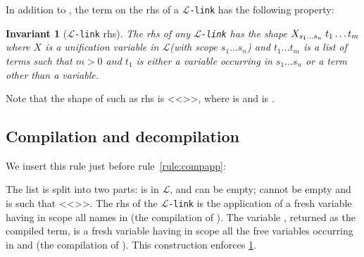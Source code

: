 \documentclass[sigconf,natbib=false,review]{acmart}
\newtheorem{invariant}{Invariant}
\newcommand{\appsep}{\ensuremath{\textcolor{lightgray}{\cdot}}}
\newcommand{\llambda}{\ensuremath{\mathcal{L}}\xspace}
\newcommand{\linkMacro}[1]{\ensuremath{#1}\texttt{-link}\xspace}
\newcommand{\linkbeta}{\linkMacro{\llambda}}
\newcommand{\linkbetaM}[3]{\ensuremath{#1 \vdash #2 =_{\llambda} #3}}
\newcommand{\rhs}{rhs\xspace}
\newcommand{\linkStore}{\texorpdfstring{\ensuremath{\mathbb{L}}\xspace}{L}}
\begin{document}
In addition to , the term on the \rhs of a \linkbeta
has the following property:

\newcommand{\rhsBetaHead}{\ensuremath{X_{s_1\dots s_n}}}
\newcommand{\rhsBeta}{\ensuremath{\rhsBetaHead\appsep t_1\dots t_m}\xspace}

\begin{invariant}[\linkbeta \rhs]
  The \rhs of any \linkbeta has the shape $X_{s_1\ldots s_n}\appsep t_1\dots t_m$
  where $X$ is a unification variable in \llambda (with scope $s_1\dots s_n$)
  and $t_1\dots t_m$ is a list of terms such that $m>0$ and
  $t_1$ is either a variable occurring in $s_1\dots s_n$ or
  a term other than a variable.
  \label{inv:beta-rhs}
\end{invariant}

\noindent Note that the shape of such as \rhs is
  <<>>, where
   is \elpiIn{[s~$_1$~, ~$\ldots$~, s~$_n$~]}
  and  is  \elpiIn{[t~$_1$~, ~$\ldots$~, t~$_m$~]}.
  




\subsection{Compilation and decompilation}

We insert this rule
just before rule~\ref{rule:compapp}:



\noindent
The list  is split into two parts: 
 is in \llambda, and can be empty; 
 cannot be empty and is such that
<<>>.
The \rhs of the \linkbeta is
the application of a fresh variable  having
in scope all names in  (the compilation of ).
The variable , returned as the compiled term, is a fresh variable
having in scope all the free variables occurring in  and
 (the compilation of ).
This construction enforces \cref{inv:beta-rhs}.
\end{document}
